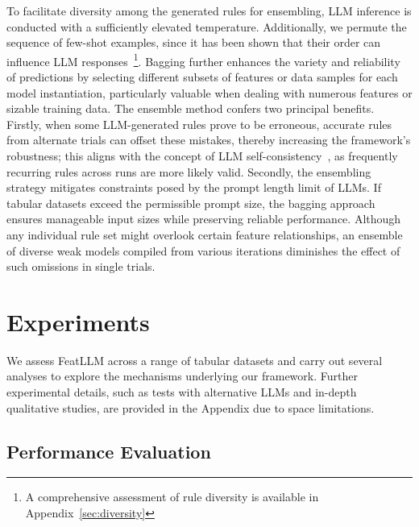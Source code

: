 To facilitate diversity among the generated rules for ensembling, LLM inference is conducted with a sufficiently elevated temperature. Additionally, we permute the sequence of few-shot examples, since it has been shown that their order can influence LLM responses~\cite{lu2022fantastically}\footnote{A comprehensive assessment of rule diversity is available in Appendix~\ref{sec:diversity}}. Bagging further enhances the variety and reliability of predictions by selecting different subsets of features or data samples for each model instantiation, particularly valuable when dealing with numerous features or sizable training data. The ensemble method confers two principal benefits. Firstly, when some LLM-generated rules prove to be erroneous, accurate rules from alternate trials can offset these mistakes, thereby increasing the framework's robustness; this aligns with the concept of LLM self-consistency~\cite{wang2022self}, as frequently recurring rules across runs are more likely valid. Secondly, the ensembling strategy mitigates constraints posed by the prompt length limit of LLMs. If tabular datasets exceed the permissible prompt size, the bagging approach ensures manageable input sizes while preserving reliable performance. Although any individual rule set might overlook certain feature relationships, an ensemble of diverse weak models compiled from various iterations diminishes the effect of such omissions in single trials.

\section{Experiments}
We assess \textsf{FeatLLM} across a range of tabular datasets and carry out several analyses to explore the mechanisms underlying our framework. Further experimental details, such as tests with alternative LLMs and in-depth qualitative studies, are provided in the Appendix due to space limitations.

\subsection{Performance Evaluation}

